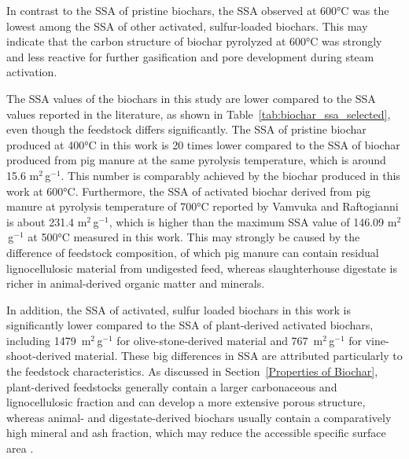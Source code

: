 \vspace{0.3em}

In contrast to the SSA of pristine biochars, the SSA observed at 600°C was the lowest among the SSA of other activated, sulfur-loaded biochars. This may indicate that the carbon structure of biochar pyrolyzed at 600°C was strongly and less reactive for further gasification and pore development during steam activation. 

\vspace{0.3em}

The SSA values of the biochars in this study are lower compared to the SSA values reported in the literature, as shown in Table~\ref{tab:biochar_ssa_selected}, even though the feedstock differs significantly. The SSA of pristine biochar produced at 400°C in this work is 20 times lower compared to the SSA of biochar produced from pig manure at the same pyrolysis temperature, which is around 15.6 m$^2$\,g$^{-1}$. This number is comparably achieved by the biochar produced in this work at 600°C. Furthermore, the SSA of activated biochar derived from pig manure at pyrolysis temperature of 700°C reported by Vamvuka and Raftogianni \cite{Vamvuka2021PigManure} is about 231.4 m$^2$\,g$^{-1}$, which is higher than the maximum SSA value of 146.09 m$^2$\,g$^{-1}$ at 500°C measured in this work. This may strongly be caused by the difference of feedstock composition, of which pig manure can contain residual lignocellulosic material from undigested feed, whereas slaughterhouse digestate is richer in animal-derived organic matter and minerals.

\vspace{0.3em}

In addition, the SSA of activated, sulfur loaded biochars in this work is significantly lower compared to the SSA of plant-derived activated biochars, including 1479~m$^2$\,g$^{-1}$ for olive-stone-derived material and 767~m$^2$\,g$^{-1}$ for vine-shoot-derived material. These big differences in SSA are attributed particularly to the feedstock characteristics. As discussed in Section~\ref{Properties of Biochar}, plant-derived feedstocks generally contain a larger carbonaceous and lignocellulosic fraction and can develop a more extensive porous structure, whereas animal- and digestate-derived biochars usually contain a comparatively high mineral and ash fraction, which may reduce the accessible specific surface area \cite{Vamvuka2021PigManure} \cite{Gargiulo2018SteamBiochar}.





